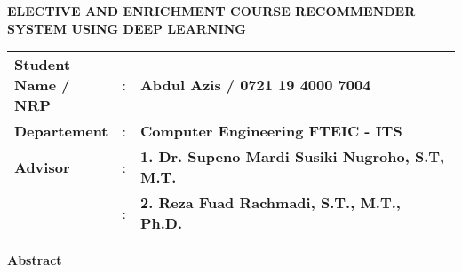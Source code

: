{
\begin{center}
    \uppercase{\textbf{\large Elective and Enrichment Course Recommender System using Deep Learning}}
\end{center}

\vspace*{6 mm}
\begin{adjustwidth}{}{}
    \begin{tabular}{lcp{1\linewidth}}
        \noindent\textbf{Student Name / NRP} & : & \textbf{Abdul Azis / 0721 19 4000 7004}                \\
        \noindent\textbf{Departement}        & : & \textbf{Computer Engineering FTEIC - ITS}              \\
        \noindent\textbf{Advisor}            & : & \textbf{1. Dr. Supeno Mardi Susiki Nugroho, S.T, M.T.} \\
                                             & : & \textbf{2. Reza Fuad Rachmadi, S.T., M.T., Ph.D.}      \\
    \end{tabular}
\end{adjustwidth}

\vspace{6 mm}
\noindent
\textbf{Abstract}
\vspace{3 mm}

}
